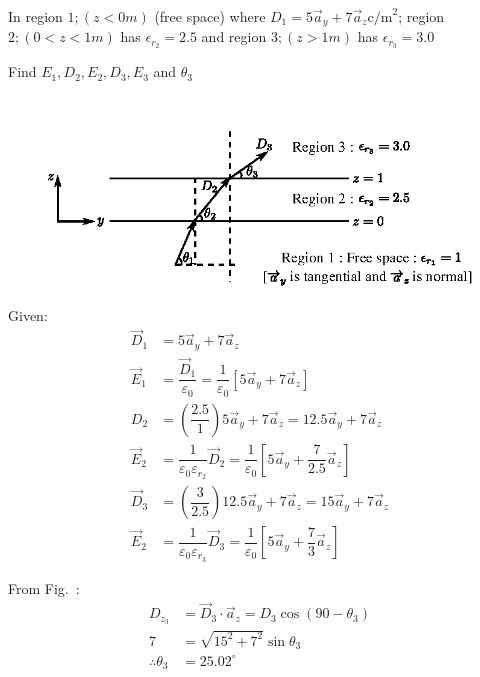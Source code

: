 \begin{problem}
In region $1 ; (z < 0m)$ (free space) where $D_{1} = 5\vec{a}_{y} + 7\vec{a}_{z} \text{c/m}^{2}$; region $2 ; (0 < z < 1m)$ has $\epsilon_{r_{2}} = 2.5$ and region $3 ; (z > 1m)$ has $\epsilon_{r_{3}} = 3.0$

Find $E_{1}, D_{2}, E_{2}, D_{3}, E_{3}$ and $\theta_{3}$
\end{problem}

\eject

\begin{solution}
~

\begin{figure}[H]
\centering
\includegraphics[scale=1.1]{images/fig6.eps}\label{chap27-fig6}
\end{figure}

Given:
\begin{align*}
\vec{D}_{1} & = 5\vec{a}_{y} + 7\vec{a}_{z}\\
\vec{E}_{1} & = \dfrac{\vec{D}_{1}}{\varepsilon_{0}} = \dfrac{1}{\varepsilon_{0}} [5\vec{a}_{y} + 7\vec{a}_{z}]\\
D_{2} & = \left(\dfrac{2.5}{1}\right) 5\vec{a}_{y} + 7\vec{a}_{z} = 12.5\vec{a}_{y} + 7\vec{a}_{z}\\
\vec{E}_{2} & = \dfrac{1}{\varepsilon_{0}\varepsilon_{r_{2}}} \vec{D}_{2} = \dfrac{1}{\varepsilon_{0}} \left[5\vec{a}_{y} + \dfrac{7}{2.5} \vec{a}_{z}\right]\\
\vec{D}_{3} & = \left(\dfrac{3}{2.5}\right) 12.5\vec{a}_{y} + 7\vec{a}_{z} = 15\vec{a}_{y} + 7\vec{a}_{z}\\
\vec{E}_{2} & = \dfrac{1}{\varepsilon_{0}\varepsilon_{r_{3}}} \vec{D}_{3} = \dfrac{1}{\varepsilon_{0}} \left[5\vec{a}_{y} + \dfrac{7}{3} \vec{a}_{z}\right]
\end{align*}

From Fig.~: 
\begin{align*}
D_{z_{3}} & = \vec{D}_{3} \cdot \vec{a}_{z} = D_{3} \cos (90 - \theta_{3})\\
7 & = \sqrt{15^{2} + 7^{2}} \sin \theta_{3}\\
\therefore \theta_{3} & = 25.02^{\circ}
\end{align*}
\end{solution}

